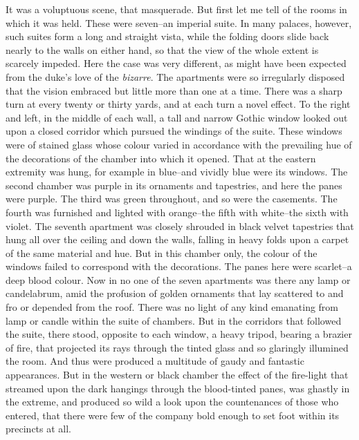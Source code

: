 \documentclass[smalldemyvopaper,14pt,twoside,onecolumn,openright,extrafontsizes,showtrims]{memoir}
\begin{document}
It was a voluptuous scene, that masquerade. But first let me tell of the rooms in which it was held. These were seven--an imperial suite. In many palaces, however, such suites form a long and straight vista, while the folding doors slide back nearly to the walls on either hand, so that the view of the whole extent is scarcely impeded. Here the case was very different, as might have been expected from the duke's love of the \textit{bizarre}. The apartments were so irregularly disposed that the vision embraced but little more than one at a time. There was a sharp turn at every twenty or thirty yards, and at each turn a novel effect. To the right and left, in the middle of each wall, a tall and narrow Gothic window looked out upon a closed corridor which pursued the windings of the suite. These windows were of stained glass whose colour varied in accordance with the prevailing hue of the decorations of the chamber into which it opened. That at the eastern extremity was hung, for example in blue--and vividly blue were its windows. The second chamber was purple in its ornaments and tapestries, and here the panes were purple. The third was green throughout, and so were the casements. The fourth was furnished and lighted with orange--the fifth with white--the sixth with violet. The seventh apartment was closely shrouded in black velvet tapestries that hung all over the ceiling and down the walls, falling in heavy folds upon a carpet of the same material and hue. But in this chamber only, the colour of the windows failed to correspond with the decorations. The panes here were scarlet--a deep blood colour. Now in no one of the seven apartments was there any lamp or candelabrum, amid the profusion of golden ornaments that lay scattered to and fro or depended from the roof. There was no light of any kind emanating from lamp or candle within the suite of chambers. But in the corridors that followed the suite, there stood, opposite to each window, a heavy tripod, bearing a brazier of fire, that projected its rays through the tinted glass and so glaringly illumined the room. And thus were produced a multitude of gaudy and fantastic appearances. But in the western or black chamber the effect of the fire-light that streamed upon the dark hangings through the blood-tinted panes, was ghastly in the extreme, and produced so wild a look upon the countenances of those who entered, that there were few of the company bold enough to set foot within its precincts at all.
\end{document}
